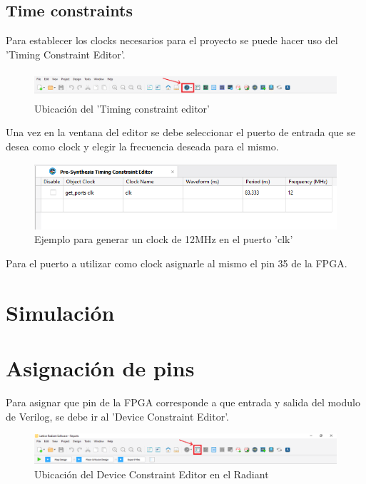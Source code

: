 \documentclass{article}
\begin{document}
\subsection{Time constraints}
Para establecer los clocks necesarios para el proyecto se puede hacer uso del 'Timing Constraint Editor'.
	\begin{figure}[H]
	\centering
	\includegraphics[height=1cm,width=\linewidth]{Imagenes/UbicacionTiming.png}
	\caption{Ubicación del 'Timing constraint editor'}
	\end{figure}
Una vez en la ventana del editor se debe seleccionar el puerto de entrada que se desea como clock y elegir la frecuencia deseada para el mismo.
	\begin{figure}[H]
	\centering
	\includegraphics[width=0.7\linewidth]{Imagenes/Clk_ejemplo.png}
	\caption{Ejemplo para generar un clock de 12MHz en el puerto 'clk'}
	\end{figure}
Para el puerto a utilizar como clock asignarle al mismo el pin 35 de la FPGA.

\section{Simulación}

\section{Asignación de pins}
Para asignar que pin de la FPGA corresponde a que entrada y salida del modulo de Verilog, se debe ir al 'Device Constraint Editor'.
	\begin{figure}[H]
	\centering
	\includegraphics[width=\textwidth]{Imagenes/pins.png}
	\caption{Ubicación del Device Constraint Editor en el Radiant}
	\end{figure}
	
\end{document}
